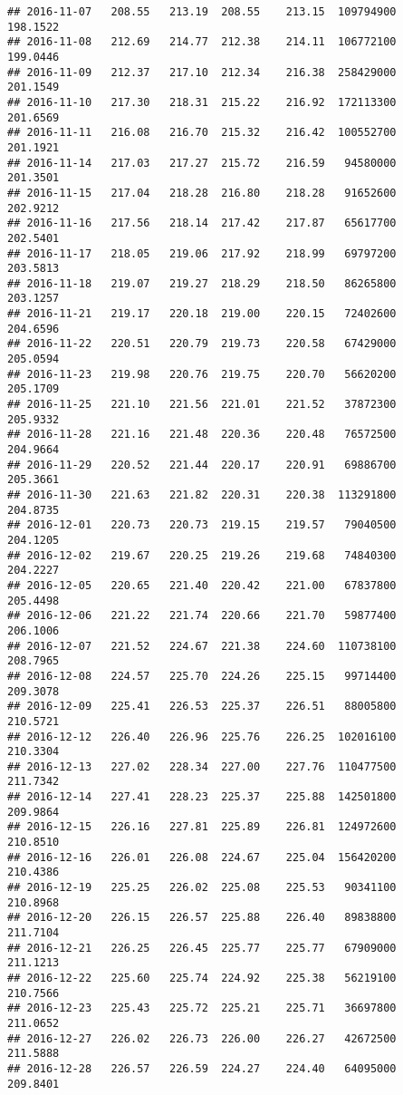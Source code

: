 \documentclass[
]{article}
\begin{document}
\begin{verbatim}
## 2016-11-07   208.55   213.19  208.55    213.15  109794900     198.1522
## 2016-11-08   212.69   214.77  212.38    214.11  106772100     199.0446
## 2016-11-09   212.37   217.10  212.34    216.38  258429000     201.1549
## 2016-11-10   217.30   218.31  215.22    216.92  172113300     201.6569
## 2016-11-11   216.08   216.70  215.32    216.42  100552700     201.1921
## 2016-11-14   217.03   217.27  215.72    216.59   94580000     201.3501
## 2016-11-15   217.04   218.28  216.80    218.28   91652600     202.9212
## 2016-11-16   217.56   218.14  217.42    217.87   65617700     202.5401
## 2016-11-17   218.05   219.06  217.92    218.99   69797200     203.5813
## 2016-11-18   219.07   219.27  218.29    218.50   86265800     203.1257
## 2016-11-21   219.17   220.18  219.00    220.15   72402600     204.6596
## 2016-11-22   220.51   220.79  219.73    220.58   67429000     205.0594
## 2016-11-23   219.98   220.76  219.75    220.70   56620200     205.1709
## 2016-11-25   221.10   221.56  221.01    221.52   37872300     205.9332
## 2016-11-28   221.16   221.48  220.36    220.48   76572500     204.9664
## 2016-11-29   220.52   221.44  220.17    220.91   69886700     205.3661
## 2016-11-30   221.63   221.82  220.31    220.38  113291800     204.8735
## 2016-12-01   220.73   220.73  219.15    219.57   79040500     204.1205
## 2016-12-02   219.67   220.25  219.26    219.68   74840300     204.2227
## 2016-12-05   220.65   221.40  220.42    221.00   67837800     205.4498
## 2016-12-06   221.22   221.74  220.66    221.70   59877400     206.1006
## 2016-12-07   221.52   224.67  221.38    224.60  110738100     208.7965
## 2016-12-08   224.57   225.70  224.26    225.15   99714400     209.3078
## 2016-12-09   225.41   226.53  225.37    226.51   88005800     210.5721
## 2016-12-12   226.40   226.96  225.76    226.25  102016100     210.3304
## 2016-12-13   227.02   228.34  227.00    227.76  110477500     211.7342
## 2016-12-14   227.41   228.23  225.37    225.88  142501800     209.9864
## 2016-12-15   226.16   227.81  225.89    226.81  124972600     210.8510
## 2016-12-16   226.01   226.08  224.67    225.04  156420200     210.4386
## 2016-12-19   225.25   226.02  225.08    225.53   90341100     210.8968
## 2016-12-20   226.15   226.57  225.88    226.40   89838800     211.7104
## 2016-12-21   226.25   226.45  225.77    225.77   67909000     211.1213
## 2016-12-22   225.60   225.74  224.92    225.38   56219100     210.7566
## 2016-12-23   225.43   225.72  225.21    225.71   36697800     211.0652
## 2016-12-27   226.02   226.73  226.00    226.27   42672500     211.5888
## 2016-12-28   226.57   226.59  224.27    224.40   64095000     209.8401

\end{verbatim}
\end{document}
